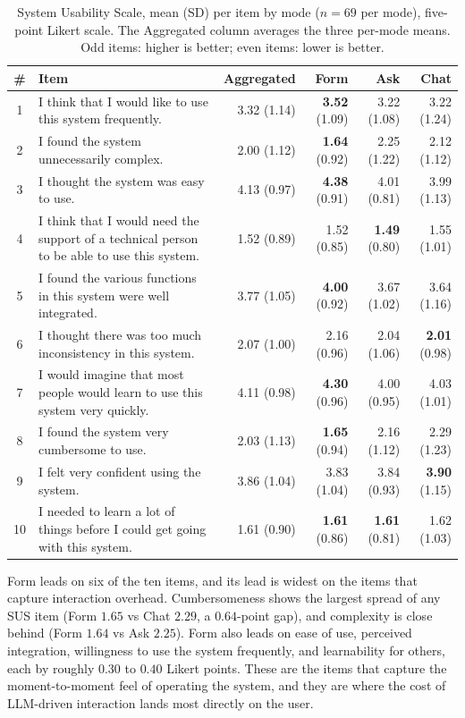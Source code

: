 \begin{table}[htbp]
\centering
\small
\begin{tabularx}{\linewidth}{@{}c X r r r r@{}}
\toprule
\# & Item & Aggregated & Form & Ask & Chat \\
\midrule
1 & I think that I would like to use this system frequently. & 3.32 (1.14) & \textbf{3.52} (1.09) & 3.22 (1.08) & 3.22 (1.24) \\
2 & I found the system unnecessarily complex. & 2.00 (1.12) & \textbf{1.64} (0.92) & 2.25 (1.22) & 2.12 (1.12) \\
3 & I thought the system was easy to use. & 4.13 (0.97) & \textbf{4.38} (0.91) & 4.01 (0.81) & 3.99 (1.13) \\
4 & I think that I would need the support of a technical person to be able to use this system. & 1.52 (0.89) & 1.52 (0.85) & \textbf{1.49} (0.80) & 1.55 (1.01) \\
5 & I found the various functions in this system were well integrated. & 3.77 (1.05) & \textbf{4.00} (0.92) & 3.67 (1.02) & 3.64 (1.16) \\
6 & I thought there was too much inconsistency in this system. & 2.07 (1.00) & 2.16 (0.96) & 2.04 (1.06) & \textbf{2.01} (0.98) \\
7 & I would imagine that most people would learn to use this system very quickly. & 4.11 (0.98) & \textbf{4.30} (0.96) & 4.00 (0.95) & 4.03 (1.01) \\
8 & I found the system very cumbersome to use. & 2.03 (1.13) & \textbf{1.65} (0.94) & 2.16 (1.12) & 2.29 (1.23) \\
9 & I felt very confident using the system. & 3.86 (1.04) & 3.83 (1.04) & 3.84 (0.93) & \textbf{3.90} (1.15) \\
10 & I needed to learn a lot of things before I could get going with this system. & 1.61 (0.90) & \textbf{1.61} (0.86) & \textbf{1.61} (0.81) & 1.62 (1.03) \\
\bottomrule
\end{tabularx}
\caption{System Usability Scale, mean (SD) per item by mode
($n = 69$ per mode), five-point Likert scale. The Aggregated
column averages the three per-mode means. Odd items: higher is
better; even items: lower is better.}
\label{tab:sus-per-item}
\end{table}

Form leads on six of the ten items, and its lead is widest on the
items that capture interaction overhead. Cumbersomeness shows the
largest spread of any SUS item (Form $1.65$ vs Chat $2.29$, a
$0.64$-point gap), and complexity is close behind (Form $1.64$ vs
Ask $2.25$). Form also leads on ease of use, perceived
integration, willingness to use the system frequently, and
learnability for others, each by roughly $0.30$ to $0.40$ Likert
points. These are the items that capture the moment-to-moment feel
of operating the system, and they are where the cost of LLM-driven
interaction lands most directly on the user.

